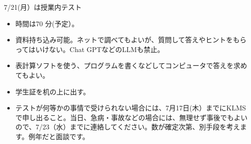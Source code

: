 \begin{slide}{7/21(月）は授業内テスト}
\begin{itemize}
\item 時間は70 分(予定）。
\item 資料持ち込み可能。ネットで調べてもよいが、質問して答えやヒントをもらってはいけない。Chat GPTなどのLLMも禁止。
\item 表計算ソフトを使う、プログラムを書くなどしてコンピュータで答えを求めてもよい。
\item 学生証を机の上に出す。
\item テストが何等かの事情で受けられない場合には、7月17日(木）までにKLMSで申し出ること。当日、急病・事故などの場合には、無理せず事後でもよいので、7/23（水）までに連絡してください。数が確定次第、別手段を考えます。例年だと面談です。
\end{itemize}
\end{slide}